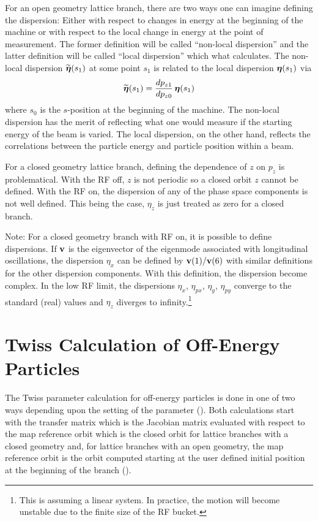 For an open geometry lattice branch, there are two ways one can imagine
defining the dispersion: Either with respect to changes in energy at the beginning of the machine or
with respect to the local change in energy at the point of measurement. The former definition will
be called ``non-local dispersion'' and the latter definition will be called ``local dispersion''
which what \bmad calculates. The non-local dispersion $\widetilde{\boldsymbol{\eta}}(s_1)$ at some point $s_1$ is
related to the local dispersion $\boldsymbol{\eta}(s_1)$ via
\begin{equation}
  \widetilde{\boldsymbol{\eta}}(s_1) = \frac{dp_{z1}}{dp_{z0}} \, \boldsymbol{\eta}(s_1)
\end{equation}
where $s_0$ is the $s$-position at the beginning of the machine. The non-local dispersion has the
merit of reflecting what one would measure if the starting energy of the beam is varied. The local
dispersion, on the other hand, reflects the correlations between the particle energy and particle
position within a beam.

For a closed geometry lattice branch, defining the dependence of $z$ on $p_z$ is problematical.
With the RF off, $z$ is not periodic so a closed orbit $z$ cannot be defined.  With the RF on, the
dispersion of any of the phase space components is not well defined.  This being the case, $\eta_z$
is just treated as zero for a closed branch.  

Note: For a closed geometry branch with RF on, it is possible to define dispersions. If ${\bf v}$ is
the eigenvector of the eigenmode associated with longitudinal oscillations, the dispersion $\eta_x$
can be defined by ${\bf v}(1) / {\bf v}(6)$ with similar definitions for the other dispersion components.
With this definition, the dispersion become complex. In the low RF limit, the dispersions $\eta_x$,
$\eta_{px}$, $\eta_y$, $\eta_{py}$ converge to the standard (real) values and $\eta_z$ diverges
to infinity.\footnote
  {
This is assuming a linear system. In practice, the motion will become unstable due to
the finite size of the RF bucket.
  }

\section{Twiss Calculation of Off-Energy Particles}
\label{s:off.twiss}

The Twiss parameter calculation for off-energy particles is done in one of two ways depending upon
the setting of the  parameter  ().  Both
calculations start with the transfer matrix which is the Jacobian matrix evaluated with respect
to the map reference orbit which is the closed orbit for lattice branches with a closed
geometry and, for lattice branches with an open geometry, the map reference orbit is the orbit computed
starting at the user defined initial position at the beginning of the branch ().

